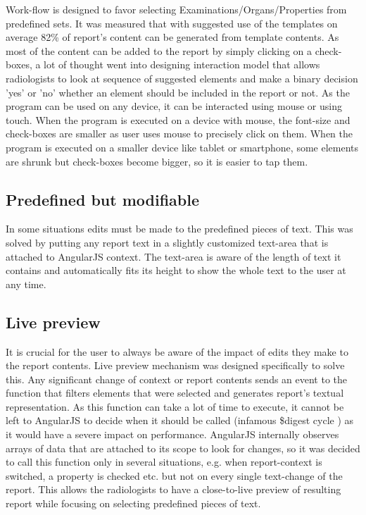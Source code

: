 \documentclass[12pt, twoside, openany]{report}
\theoremstyle{definition}
\begin{document}
Work-flow is designed to favor selecting Examinations/Organs/Properties from predefined sets. It was measured that with suggested use of the templates on average 82\% of report's content can be generated from template contents. As most of the content can be added to the report by simply clicking on a check-boxes, a lot of thought went into designing interaction model that allows radiologists to look at sequence of suggested elements and make a binary decision 'yes' or 'no' whether an element should be included in the report or not. 
As the program can be used on any device, it can be interacted using mouse or using touch. When the program is executed on a device with mouse, the font-size and check-boxes are smaller as user uses mouse to precisely click on them. When the program is executed on a smaller device like tablet or smartphone, some elements are shrunk but check-boxes become bigger, so it is easier to tap them. 

\subsection{Predefined but modifiable}
In some situations edits must be made to the predefined pieces of text. This was solved by putting any report text in a slightly customized text-area that is attached to AngularJS context. The text-area is aware of the length of text it contains and automatically fits its height to show the whole text to the user at any time.


\subsection{Live preview}
It is crucial for the user to always be aware of the impact of edits they make to the report contents. Live preview mechanism was designed specifically to solve this. Any significant change of context or report contents sends an event to the function that filters elements that were selected and generates report's textual representation. As this function can take a lot of time to execute, it cannot be left to AngularJS to decide when it should be called (infamous \$digest cycle \cite{angular-digest}) as it would have a severe impact on performance. AngularJS internally observes arrays of data that are attached to its scope to look for changes, so it was decided to call this function only in several situations, e.g. when report-context is switched, a property is checked etc. but not on every single text-change of the report. This allows the radiologists to have a close-to-live preview of resulting report while focusing on selecting predefined pieces of text.
\end{document}
